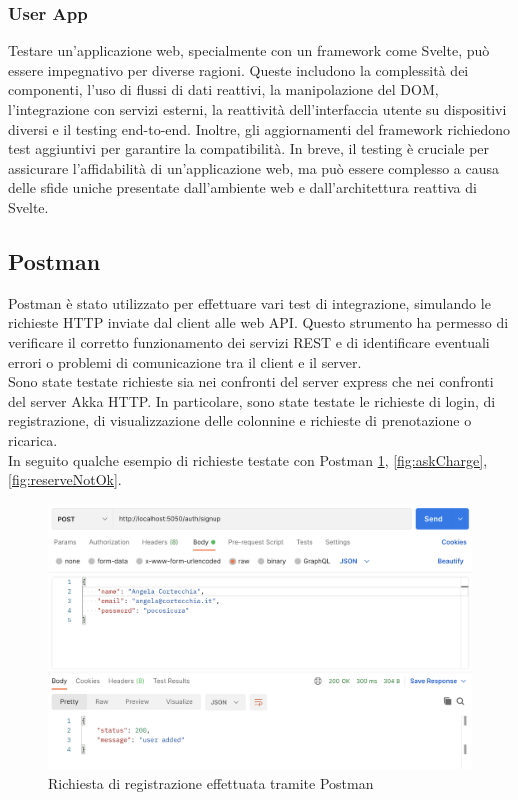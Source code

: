 \subsubsection{User App}
Testare un'applicazione web, specialmente con un framework come Svelte, può essere
impegnativo per diverse ragioni. Queste includono la complessità dei componenti,
l'uso di flussi di dati reattivi, la manipolazione del DOM, l'integrazione con servizi
esterni, la reattività dell'interfaccia utente su dispositivi diversi e il testing end-to-end.
Inoltre, gli aggiornamenti del framework richiedono test aggiuntivi per garantire la compatibilità.
In breve, il testing è cruciale per assicurare l'affidabilità di un'applicazione web, ma può essere
complesso a causa delle sfide uniche presentate dall'ambiente web e dall'architettura reattiva di Svelte.

\subsection{Postman}
Postman \cite{postman} è stato utilizzato per effettuare vari test di integrazione, simulando le richieste
HTTP inviate dal client alle web API. Questo strumento ha permesso di verificare il corretto
funzionamento dei servizi REST e di identificare eventuali errori o problemi di comunicazione
tra il client e il server.\\

Sono state testate richieste sia nei confronti del server express che nei confronti del server
Akka HTTP. In particolare, sono state testate le richieste di login, di registrazione,
di visualizzazione delle colonnine e richieste di prenotazione o ricarica.\\

In seguito qualche esempio di richieste testate con Postman \ref{fig:signupPostman}, \ref{fig:askCharge}, \ref{fig:reserveNotOk}.

\begin{figure}[htbp]
  \centering
  \includegraphics[width=\textwidth]{images/signupPostman.png}
  \caption{Richiesta di registrazione effettuata tramite Postman}
  \label{fig:signupPostman}
\end{figure}

